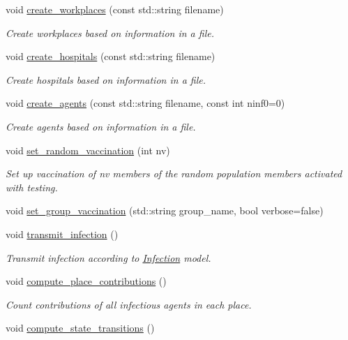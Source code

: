 \begin{DoxyCompactItemize}
void \hyperlink{classABM_abe3f8db8d70dbbaa40815515f4057ced}{create\+\_\+workplaces} (const std\+::string filename)
\begin{DoxyCompactList}\small\item\em Create workplaces based on information in a file. \end{DoxyCompactList}\item 
void \hyperlink{classABM_a3f0199d0d954cf0b3ecffc8a82c3c958}{create\+\_\+hospitals} (const std\+::string filename)
\begin{DoxyCompactList}\small\item\em Create hospitals based on information in a file. \end{DoxyCompactList}\item 
void \hyperlink{classABM_a5ed9bcec2972c5e6967dbec30947c94c}{create\+\_\+agents} (const std\+::string filename, const int ninf0=0)
\begin{DoxyCompactList}\small\item\em Create agents based on information in a file. \end{DoxyCompactList}\item 
void \hyperlink{classABM_af80a8ff3dbbd2e64693c127702c0b64e}{set\+\_\+random\+\_\+vaccination} (int nv)
\begin{DoxyCompactList}\small\item\em Set up vaccination of nv members of the random population members activated with testing. \end{DoxyCompactList}\item 
void \hyperlink{classABM_ab9fbab941825f16e4bce0fdb4b27363c}{set\+\_\+group\+\_\+vaccination} (std\+::string group\+\_\+name, bool verbose=false)
\item 
void \hyperlink{classABM_a532b704843314423cc3ffc4e2ed66f1a}{transmit\+\_\+infection} ()
\begin{DoxyCompactList}\small\item\em Transmit infection according to \hyperlink{classInfection}{Infection} model. \end{DoxyCompactList}\item 
void \hyperlink{classABM_a9f2c80f84bf116c3444df95f34ead1dc}{compute\+\_\+place\+\_\+contributions} ()
\begin{DoxyCompactList}\small\item\em Count contributions of all infectious agents in each place. \end{DoxyCompactList}\item 
void \hyperlink{classABM_ad1e04b146d0c55ee36449def71bb0e51}{compute\+\_\+state\+\_\+transitions} ()

\end{DoxyCompactItemize}
